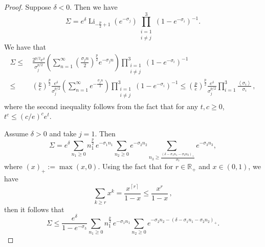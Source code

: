 \documentclass[11pt]{amsart}
\theoremstyle{plain}
\theoremstyle{definition}
\newcommand		{\RR}		{\mathbb R}			%
\newcommand		{\R}		{\RR}
\newcommand		{\lt}			{\left}				%
\newcommand		{\rt}			{\right}			%
\renewcommand	{\(}			{\lt(}
\renewcommand	{\)}			{\rt)}
\newcommand		{\ceil}[1]		{\lt\lceil{#1}\rt\rceil}
\newcommand		{\bangle}[1]	{\lt\langle #1\rt\rangle}
\newcommand		{\weight}[1]	{\bangle{#1}}	%
\begin{document}
	\begin{proof}
        Suppose $\delta<0$. Then we have 
        \begin{equation*}
            \Sigma=e^\delta\operatorname{Li}_{-\frac{p}{2}+1}(e^{-\sigma_j}) \prod_{\substack{i=1\\ i\ne j}}^3 (1-e^{-\sigma_i})^{-1}.
        \end{equation*}
        We have that 
        \begin{align*}
            \Sigma \le&\, \frac{2^{p/2}e^\delta}{\sigma_j^{p/2}} \lt(\sum^\infty_{n=1} \lt(\frac{\sigma_j n}{2}\rt)^{\frac{p}{2}} e^{-\sigma_j n}\rt)\prod_{\substack{i=1\\ i\ne j}}^3 (1-e^{-\sigma_i})^{-1} \\
            \le&\, \lt(\frac{p}{e}\rt)^{\frac{p}{2}}\frac{e^\delta}{\sigma_j^{p/2}} \lt(\sum^\infty_{n=1} e^{-\frac{\sigma_j n}{2}}\rt)\prod_{\substack{i=1\\ i\ne j}}^3 (1-e^{-\sigma_i})^{-1}\le \lt(\frac{p}{e}\rt)^{\frac{p}{2}}\frac{e^\delta}{\sigma_j^{p/2}} \prod^3_{i=1} \frac{\weight{\sigma_i}}{\sigma_i}\,,
        \end{align*}
        where the second inequality follows from the fact that for any $t,c\geq 0$, $t^c \leq \lt(c/e\rt)^c e^t$.

        
		Assume $\delta>0$ and take $j=1$. Then
		\begin{equation*}
			\Sigma 
            = e^{\delta}\sum_{n_1\geq 0} n_1^\frac{p}{2}\,e^{-\sigma_1 n_1} \sum_{n_2\geq 0} e^{-\sigma_2 n_2} \sum_{n_3 \geq \frac{(\delta-\sigma_1 n_1-\sigma_2 n_2)_+}{\sigma_3}} e^{-\sigma_3 n_3} ,
		\end{equation*}
        where $(x)_+:= \max(x, 0)$. Using the fact that for $r\in\R_+$ and $x\in(0,1)$, we have
		\begin{equation*}
			\sum_{k\geq r} x^k = \frac{x^{\ceil{r}}}{1-x} \leq \frac{x^r}{1-x} \, ,
		\end{equation*}
		then it follows that
		\begin{equation*}
			\Sigma \leq \frac{e^\delta}{1-e^{-\sigma_3}} \sum_{n_1\geq 0} n_1^\frac{p}{2}\,e^{-\sigma_1 n_1} \sum_{n_2\geq 0} e^{-\sigma_2 n_2 - (\delta-\sigma_1 n_1-\sigma_2 n_2)_+} .
		\end{equation*}
        

\end{proof}
\end{document}

